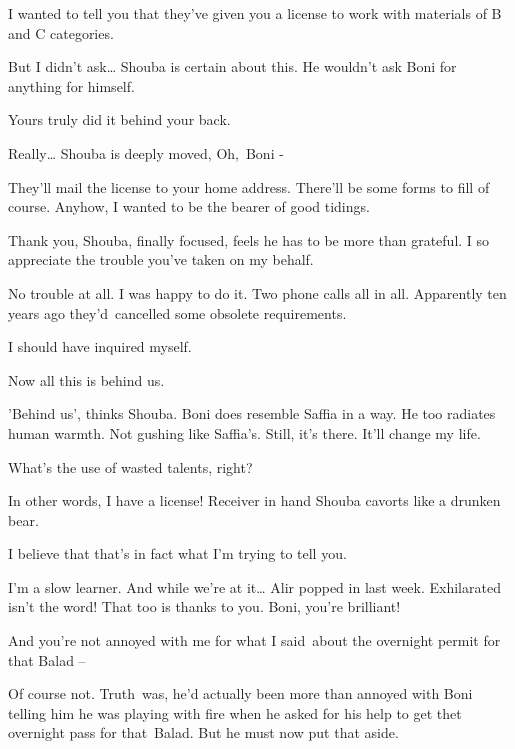 \documentclass[letterpaper]{article}
\begin{document}
{\textquotedbl}I wanted to tell you that they've given you a license to work with materials of B and C
categories.{\textquotedbl} 

{\textquotedbl}But I didn't ask{\dots}{\textquotedbl} Shouba is certain about this. He wouldn't ask Boni for anything
for himself. 

{\textquotedbl}Yours truly did it behind your back.{\textquotedbl} 

{\textquotedbl}Really{\dots}{\textquotedbl} Shouba is deeply moved, {\textquotedbl}Oh,~Boni -{\textquotedbl} 

{\textquotedbl}They'll mail the license to your home address. There'll be some forms to fill of course. Anyhow, I wanted
to be the bearer of good tidings.{\textquotedbl} 

{\textquotedbl}Thank you,{\textquotedbl} Shouba, finally focused, feels he has to be more than grateful.
{\textquotedbl}I so appreciate the trouble you've taken on my behalf.{\textquotedbl} 

{\textquotedbl}No trouble at all. I was happy to do it. Two phone calls all in all. Apparently ten years ago
they{}'d\ cancelled some obsolete requirements.{\textquotedbl} 

{\textquotedbl}I should have inquired myself.{\textquotedbl} 

{\textquotedbl}Now all this is behind us.{\textquotedbl} 

{}'Behind us', thinks Shouba. Boni does resemble Saffia in a way. He too radiates human warmth. Not gushing like
Saffia{}'s. Still, it's there. {\textquotedbl}It'll change my life.{\textquotedbl} 

{\textquotedbl}What's the use of wasted talents, right?{\textquotedbl} 

{\textquotedbl}In other words, I have a license!{\textquotedbl} Receiver in hand Shouba cavorts like a drunken bear. 

{\textquotedbl}I believe that that's in fact what I'm trying to tell you.{\textquotedbl} 

{\textquotedbl}I'm a slow learner. And while we're at it{\dots} Alir popped in last week. Exhilarated isn't the word!
That too is thanks to you. Boni, you're brilliant!{\textquotedbl} 

{\textquotedbl}And you're not annoyed with me for what I said~about the overnight permit for that Balad
--{\textquotedbl} 

{\textquotedbl}Of course not.{\textquotedbl} Truth\textcolor{red}{\ }was, he'd actually been more than annoyed with Boni
telling him he was playing with fire when he asked for his help to get thet overnight pass for
that\textcolor{red}{\ }Balad. But he must now put that aside. 
\end{document}
